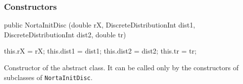 \subsubsection* {Constructors}

\begin{code}

   public NortaInitDisc (double rX, DiscreteDistributionInt dist1,
                         DiscreteDistributionInt dist2, double tr)\begin{hide} {
      this.rX = rX;
      this.dist1 = dist1;
      this.dist2 = dist2;
      this.tr = tr;
   }\end{hide}
\end{code}
\begin{tabb}
 Constructor of the abstract class. It can be called only by
 the constructors of subclasses of \texttt{NortaInitDisc}.
  \end{tabb}


